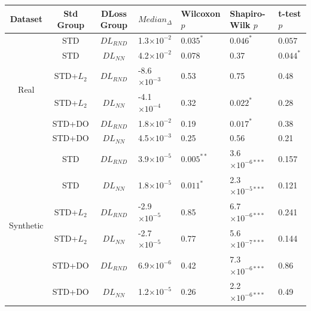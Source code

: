 \documentclass{article}
\begin{document}
\begin{table}[tb]
  \begin{center}
  \begin{small}
  \begin{sc}
  \begin{tabular}{ccc|llll}
  
  \toprule
  Dataset & Std Group & DLoss Group & $Median_{\Delta}$ & Wilcoxon $p$ & Shapiro-Wilk $p$ & t-test $p$\\
  
  \midrule
  \multirow{6}{*}{Real} & STD & $DL_{RND}$ & 1.3$\times10^{-2}$ & $0.035^{*}$ & $0.046^{*}$ & $0.057$ \\
 &STD & $DL_{NN}$ & 4.2$\times10^{-2}$ & 0.078 & 0.37 & $0.044^{*}$\\
 &STD+$L_2$& $DL_{RND}$ & -8.6$\times10^{-3}$ & 0.53 & 0.75 & 0.48 \\
 &STD+$L_2$& $DL_{NN}$ & -4.1$\times10^{-4}$ & 0.32 & $0.022^{*}$ & 0.28 \\
 &STD+DO& $DL_{RND}$ & 1.8$\times10^{-2}$ & 0.19 & $0.017^{*}$ & 0.38 \\
 &STD+DO& $DL_{NN}$ & 4.5$\times10^{-3}$ & 0.25 & 0.56 & 0.21 \\
  
  \hline
  \multirow{6}{*}{Synthetic} & STD & $DL_{RND}$ & 3.9$\times10^{-5}$ & $0.005^{**}$ & 3.6$\times10^{-6***}$ & 0.157\\
 &STD & $DL_{NN}$ & 1.8$\times10^{-5}$ & $0.011^{*}$ & 2.3$\times10^{-5***}$ & 0.121 \\
 &STD+$L_2$& $DL_{RND}$ & -2.9$\times10^{-5}$ & 0.85 & 6.7$\times10^{-6***}$ & 0.241\\
 &STD+$L_2$& $DL_{NN}$ & -2.7$\times10^{-5}$ & 0.77 & 5.6$\times10^{-7***}$ & 0.144\\
 &STD+DO& $DL_{RND}$ & 6.9$\times10^{-6}$ & 0.42 & 7.3$\times10^{-6***}$ & 0.86 \\
 &STD+DO& $DL_{NN}$ & 1.2$\times10^{-5}$ & 0.26 & 2.2$\times10^{-6***}$ & 0.49 \\
  
  \bottomrule
  \end{tabular}
 
  \end{sc}
  \end{small}
  \end{center}


\end{table}
\end{document}
